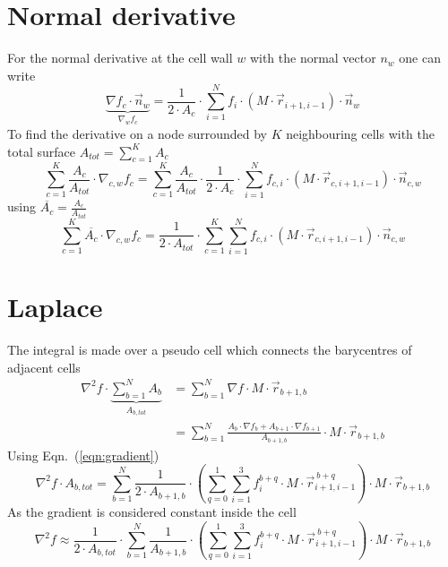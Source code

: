 \section{Normal derivative}
For the normal derivative at the cell wall $w$ with the normal vector $n_w$ one can write
\begin{equation}
    \underbrace{\nabla f_c \cdot \vec{n}_w}_{\nabla_{w} f_c} = \frac{1}{2 \cdot A_c} \cdot \sum_{i = 1}^N f_i \cdot (M \cdot \vec{r}_{i + 1,i - 1}) \cdot \vec{n}_w
\end{equation}
To find the derivative on a node surrounded by $K$ neighbouring cells with the total surface $A_{tot} = \sum_{c=1}^K A_c$
\begin{equation}
    \sum_{c=1}^K \frac{A_c}{A_{tot}} \cdot \nabla_{c, w} f_c = \sum_{c=1}^K \frac{A_c}{A_{tot}} \cdot \frac{1}{2 \cdot A_c} \cdot \sum_{i = 1}^N f_{c, i} \cdot (M \cdot \vec{r}_{c, i + 1,i - 1}) \cdot \vec{n}_{c,w}
\end{equation}
using $\overline{A_c} = \frac{A_c}{A_{tot}}$
\begin{equation}
    \sum_{c=1}^K \overline{A_c} \cdot \nabla_{c, w} f_c = \frac{1}{2 \cdot A_{tot}} \cdot\sum_{c=1}^K  \sum_{i = 1}^N f_{c, i} \cdot (M \cdot \vec{r}_{c, i + 1,i - 1}) \cdot \vec{n}_{c, w}
\end{equation}

\section{Laplace}
The integral is made over a pseudo cell which connects the barycentres of adjacent cells
\begin{equation}
    \begin{split}
        \nabla^2 f \cdot \underbrace{\sum_{b=1}^N A_b}_{A_{b, tot}}  &=  \sum_{b = 1}^N \nabla f \cdot M \cdot \vec{r}_{b + 1,b} \\
        &= \sum_{b = 1}^N \frac{A_b \cdot\nabla f_{b} + A_{b+ 1} \cdot \nabla f_{b + 1}}{A_{b+1, b}} \cdot M \cdot \vec{r}_{b + 1,b} 
    \end{split}
\end{equation}
Using Eqn.~(\ref{eqn:gradient}) 
\begin{equation}
    \nabla^2 f \cdot A_{b, tot}  = \sum_{b = 1}^N \frac{1}{2 \cdot A_{b+ 1, b}} \cdot \left( \sum_{q=0}^1\sum_{i = 1}^3 f^{b + q}_{i} \cdot M \cdot \vec{r}^{\:b + q}_{i + 1,i - 1}  \right) \cdot M \cdot \vec{r}_{b + 1,b}
\end{equation}
As the gradient is considered constant inside the cell
\begin{equation}
    \nabla^2 f \approx \frac{1}{2 \cdot A_{b, tot}} \cdot\sum_{b = 1}^N \frac{1}{A_{b+ 1, b}} \cdot \left( \sum_{q=0}^1\sum_{i = 1}^3 f^{b + q}_{i} \cdot M \cdot \vec{r}^{\:b + q}_{i + 1,i - 1}  \right) \cdot M \cdot \vec{r}_{b + 1,b}
\end{equation}
